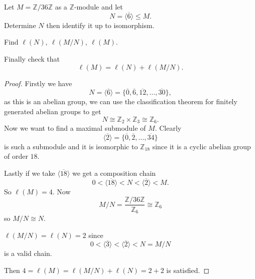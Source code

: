 \documentclass[11pt]{article}
\begin{document}
\begin{prob}
    Let $M = \mathbb Z/36\mathbb Z$ as a 
    $\mathbb Z$-module and let 
    $$
        N = \langle \overline 6 \rangle \leq M. 
    $$
    Determine $N$ then identify it up to isomorphism. 

    Find $\ell (N), \ \ell(M/N), \ \ell(M)$. 

    Finally check that 
    $$
        \ell(M) = \ell(N) + \ell(M/N).
    $$
\end{prob}
\begin{proof}
    Firstly we have 
    \[
        N = \langle \overline 6\rangle 
        = \{\overline 0, \overline 6, 
        \overline{12}, \ldots, \overline{30}\}, 
    \] 
    as this is an abelian group, we can use the 
    classification theorem for finitely generated abelian 
    groups to get 
    \[
        N \cong \mathbb Z_2 \times \mathbb Z_3 
        \cong \mathbb Z_6. 
    \]
    Now we want to find a maximal submodule of $M$. 
    Clearly 
    \[
        \langle \overline 2\rangle 
        = \{\overline 0, \overline 2, \ldots, 
        \overline{34}\}
    \]
    is such a submodule and it is isomorphic to 
    $\mathbb Z_{18}$ since it is a cyclic 
    abelian group of order $18$. 

    Lastly if we take $\langle \overline{18}\rangle$ we get 
    a composition chain 
    \[
        0 < \langle \overline{18} \rangle < 
        N < \langle \overline 2 \rangle < M. 
    \]
    So $\ell(M) = 4$. 
    Now 
    \[
        M/N = \frac{\mathbb Z/36\mathbb Z}{\mathbb Z_6}
        \cong \mathbb Z_6
    \]
    so $M/N \cong N$.  
    
    $\ell(M/N) = \ell(N) = 2$ since 
    \[
        0 < \langle \overline 3 \rangle < \langle \overline 
        2 \rangle < N = M/N
    \]
    is a valid chain. 

    Then $4 = \ell(M) = \ell(M/N) + \ell(N) = 2 + 2$ is 
    satisfied. 
\end{proof}
\end{document}
